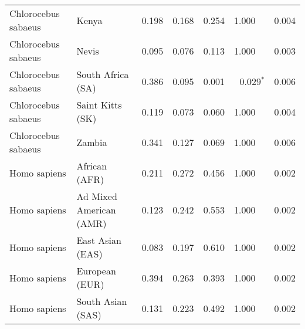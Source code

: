 \begin{center}
\begin{adjustbox}{width = 1\textwidth}
\begin{tabular}{|l|l|r|r|r|r|r|}
 Chlorocebus sabaeus &                           Kenya &                 0.198 &                                0.168 &                0.254 &                                  1.000~~ &              0.004 \\
 Chlorocebus sabaeus &                           Nevis &                 0.095 &                                0.076 &                0.113 &                                  1.000~~ &              0.003 \\
 Chlorocebus sabaeus &               South Africa (SA) &                 0.386 &                                0.095 &                0.001 &                           0.029$\bm{^*}$ &              0.006 \\
 Chlorocebus sabaeus &                Saint Kitts (SK) &                 0.119 &                                0.073 &                0.060 &                                  1.000~~ &              0.004 \\
 Chlorocebus sabaeus &                          Zambia &                 0.341 &                                0.127 &                0.069 &                                  1.000~~ &              0.006 \\
        Homo sapiens &                   African (AFR) &                 0.211 &                                0.272 &                0.456 &                                  1.000~~ &              0.002 \\
        Homo sapiens &         Ad Mixed American (AMR) &                 0.123 &                                0.242 &                0.553 &                                  1.000~~ &              0.002 \\
        Homo sapiens &                East Asian (EAS) &                 0.083 &                                0.197 &                0.610 &                                  1.000~~ &              0.002 \\
        Homo sapiens &                  European (EUR) &                 0.394 &                                0.263 &                0.393 &                                  1.000~~ &              0.002 \\
        Homo sapiens &               South Asian (SAS) &                 0.131 &                                0.223 &                0.492 &                                  1.000~~ &              0.002 \\
\bottomrule
\end{tabular}
\end{adjustbox}
\end{center}
\newpage
